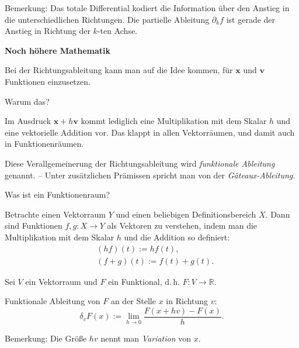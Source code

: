 \documentclass{beamer}
\newcommand{\R}{\mathbb R}
\newcommand{\strong}[1]{\textsf{\textbf{#1}}}
\begin{document}
\begin{frame}
\begin{footnotesize}
Bemerkung: Das totale Differential kodiert die Information über den
Anstieg in die unterschiedlichen Richtungen. Die partielle
Ableitung $\partial_k f$ ist gerade der Anstieg in Richtung der
$k$-ten Achse.
\end{footnotesize}
\end{frame}

\begin{frame}
\begin{center}
\strong{Noch höhere Mathematik}
\end{center}
\end{frame}

\begin{frame}
Bei der Richtungsableitung kann man auf die Idee kommen, für
$\mathbf x$ und $\mathbf v$ Funktionen einzusetzen.
\pause

\vspace{0.6em}
Warum das?
\pause

\vspace{0.6em}
Im Ausdruck $\mathbf x+h\mathbf v$ kommt lediglich eine
Multiplikation mit dem Skalar $h$ und eine vektorielle Addition vor.
Das klappt in allen Vektorräumen, und damit auch in Funktionenräumen.
\pause

\vspace{0.8em}
Diese Verallgemeinerung der Richtungsableitung wird
\emph{funktionale Ableitung} genannt. -- Unter zusätzlichen
Prämissen spricht man von der \emph{Gâteaux-Ableitung}.
\end{frame}

\begin{frame}
Was ist ein Funktionenraum?\pause

\vspace{0.8em}
Betrachte einen Vektorraum $Y$
und einen beliebigen Definitionsbereich $X$. Dann sind
Funktionen $f,g\colon X\to Y$ als Vektoren zu verstehen, indem
man die Multiplikation mit dem Skalar $h$ und
die Addition so definiert:
\begin{align*}
& (hf)(t) := hf(t),\\
& (f+g)(t) := f(t)+g(t).
\end{align*}
\end{frame}

\begin{frame}
\begin{Definition}
Sei $V$ ein Vektorraum und $F$ ein Funktional, d.\,h. $F\colon V\to\R$.

\vspace{0.6em}
Funktionale Ableitung von $F$ an der Stelle $x$ in Richtung $v$:
\[\delta_v F(x) := \lim_{h\to 0}\frac{F(x+hv)-F(x)}{h}.\]
\end{Definition}\pause

Bemerkung: Die Größe $hv$ nennt man \emph{Variation} von $x$.
\end{frame}
\end{document}
